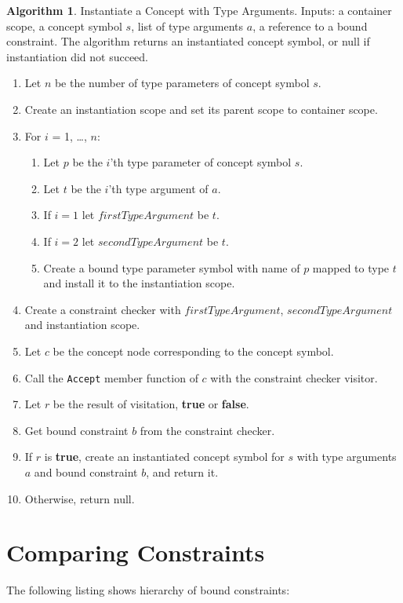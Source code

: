 \documentclass[a4paper,oneside,11pt]{book}
\theoremstyle{definition}
\newtheorem{algo}{Algorithm}[section]
\begin{document}
\begin{algo}\label{instantiateconcept} Instantiate a Concept with Type Arguments.
Inputs: a container scope, a concept symbol $s$, list of type arguments $a$, a reference to a bound constraint.
The algorithm returns an instantiated concept symbol, or null if instantiation did not succeed.
\begin{enumerate}
\item
Let $n$ be the number of type parameters of concept symbol $s$.
\item
Create an instantiation scope and set its parent scope to container scope.
\item
For $i$ = 1, \ldots, $n$:
\begin{enumerate}
\item
Let $p$ be the $i$'th type parameter of concept symbol $s$.
\item
Let $t$ be the $i$'th type argument of $a$.
\item
If $i = 1$ let $firstTypeArgument$ be $t$.
\item
If $i = 2$ let $secondTypeArgument$ be $t$.
\item
Create a bound type parameter symbol with name of $p$ mapped to type $t$ and install it to the instantiation scope.
\end{enumerate}
\item
Create a constraint checker with $firstTypeArgument$, $secondTypeArgument$ and instantiation scope.
\item
Let $c$ be the concept node corresponding to the concept symbol.
\item
Call the \verb|Accept| member function of $c$ with the constraint checker visitor.
\item
Let $r$ be the result of visitation, \textbf{true} or \textbf{false}.
\item
Get bound constraint $b$ from the constraint checker.
\item
If $r$ is \textbf{true}, create an instantiated concept symbol for $s$ with type arguments $a$ and bound constraint $b$, and return it.
\item
Otherwise, return null.
\end{enumerate}
\end{algo}

\section{Comparing Constraints}

The following listing shows hierarchy of bound constraints:
\end{document}
